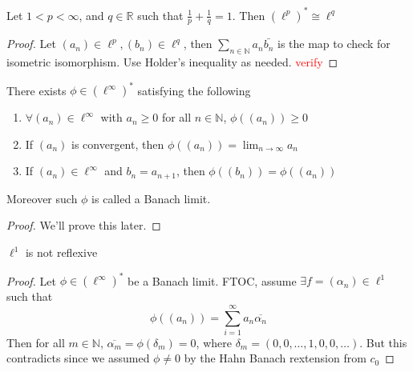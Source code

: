 \begin{theorem}
  Let $1 < p < \infty$, and $ q \in \mathbb{R}$ such that $ \frac{1}{p} + \frac{1}{q} = 1 $. Then $(\ell^p)^{*} \cong \ell^q$
\end{theorem}
\begin{proof}
  Let $(a_n) \in \ell^p, (b_n) \in \ell^q$, then $\sum_{n \in \mathbb{N}} a_n \bar{b_n}$ is the map to check for isometric isomorphism.
  Use Holder's inequality as needed. \textcolor{red}{verify}
\end{proof}

\begin{theorem}
  There exists $\phi \in (\ell^\infty)^{*}$ satisfying the following \begin{enumerate}[label=\arabic*]
    \item $\forall (a_n) \in \ell^\infty$ with $a_n \ge 0$ for all $ n \in \mathbb{N}$, $\phi((a_n)) \ge 0$
    \item If $(a_n)$ is convergent, then $\phi((a_n)) = \lim_{n \to \infty}  a_n$
    \item If $(a_n) \in \ell^\infty$ and $b_n = a_{n+1}$, then $\phi((b_n)) = \phi((a_n))$
  \end{enumerate}
  Moreover such $\phi$ is called a Banach limit.
\end{theorem}
\begin{proof}
  We'll prove this later.
\end{proof}


\begin{corollary}
  $\ell^1$ is not reflexive
\end{corollary}
\begin{proof}
  Let $\phi \in (\ell^\infty)^{*}$ be a Banach limit. FTOC, assume $\exists f = (\alpha_n) \in \ell^1$ such that  \[
    \phi((a_n)) = \sum_{i = 1}^{\infty}  a_n  \overline{\alpha_n}
  \]
  Then for all $m \in \mathbb{N}$, $\overline{\alpha_m} = \phi(\delta_m) = 0$, where $\delta_m = (0, 0, \ldots, 1, 0, 0, \ldots)$. But this contradicts since we assumed $\phi \neq 0$ by the Hahn Banach rextension from $c_0$
\end{proof}

